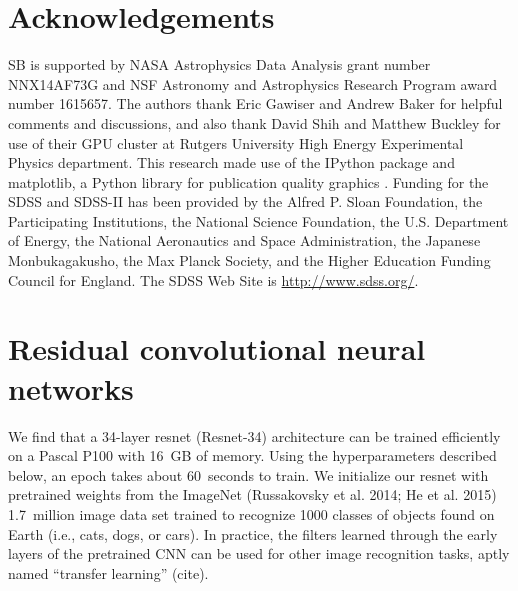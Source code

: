 \documentclass[fleqn,usenatbib]{mnras}
\begin{document}
\section*{Acknowledgements}
SB is supported by NASA Astrophysics Data Analysis grant number NNX14AF73G and NSF Astronomy and Astrophysics Research Program award number 1615657.
The authors thank Eric Gawiser and Andrew Baker for helpful comments and discussions, and also thank David Shih and Matthew Buckley for use of their GPU cluster at Rutgers University High Energy Experimental Physics department. %
This research made use of the {\sc IPython} package \citep{Perez2007} and {\sc matplotlib}, a Python library for publication quality graphics \citep{Hunter2007}. Funding for the SDSS and SDSS-II has been provided by the Alfred P. Sloan Foundation, the Participating Institutions, the National Science Foundation, the U.S. Department of Energy, the National Aeronautics and Space Administration, the Japanese Monbukagakusho, the Max Planck Society, and the Higher Education Funding Council for England. The SDSS Web Site is \url{http://www.sdss.org/}.



\appendix
%
\section{Residual convolutional neural networks}
%



We find that a 34-layer resnet (Resnet-34) architecture can be trained efficiently on a Pascal P100 with 16~GB of memory.
Using the hyperparameters described below, an epoch takes about 60~seconds to train.
We initialize our resnet with pretrained weights from the ImageNet (Russakovsky et al. 2014; He et al. 2015) 1.7~million image data set trained to recognize 1000 classes of objects found on Earth (i.e., cats, dogs, or cars).
In practice, the filters learned through the early layers of the pretrained CNN can be used for other image recognition tasks, aptly named ``transfer learning'' (cite).
\end{document}
